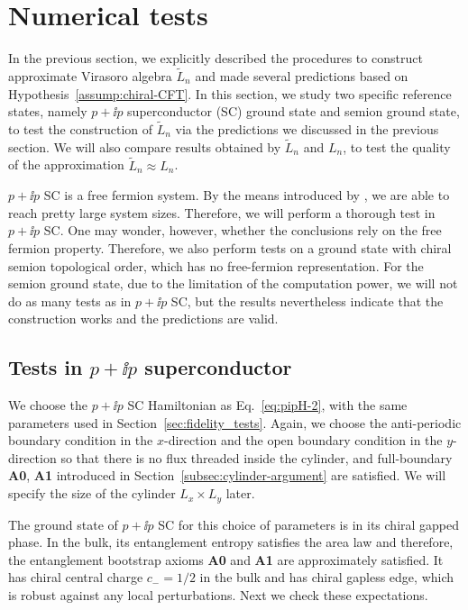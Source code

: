 \documentclass[12pt, nofootinbib]{article}
\theoremstyle{plain}
\theoremstyle{assumption}
\theoremstyle{definition}
\theoremstyle{plain}
\theoremstyle{plain}
\theoremstyle{plain}
\theoremstyle{plain}
\theoremstyle{plain}
\def\Leff{\widetilde{L}}
\begin{document}
\section{Numerical tests}
\label{sec:numerics} 
In the previous section, we explicitly described the procedures to construct approximate Virasoro algebra $\Leff_n$ and made several predictions based on Hypothesis~\ref{assump:chiral-CFT}. In this section, we study two specific reference states, namely $p+\ii p$ superconductor (SC) ground state and semion ground state, to test the construction of $\Leff_n$ via the predictions we discussed in the previous section. We will also compare results obtained by $\Leff_n$ and $L_n$, to test the quality of the approximation $\Leff_n \approx L_n$. 

$p+\ii p$ SC is a free fermion system. By the means introduced by \cite{Eisler2009}, we are able to reach pretty large system sizes. Therefore, we will perform a thorough test in $p+\ii p$ SC.  One may wonder, however, whether the conclusions rely on the free fermion property.   Therefore, we also perform tests on a ground state with chiral semion topological order, which has no free-fermion representation.  For the semion ground state, due to the limitation of the computation power, we will not do as many tests as in $p+\ii p$ SC, but the results nevertheless indicate that the construction works and the predictions are valid. 

\subsection{Tests in $p+\ii p$ superconductor}
We choose the $p+\ii p$ SC Hamiltonian as Eq.~\eqref{eq:pipH-2}, with the same parameters used in Section~\ref{sec:fidelity_tests}. Again, we choose the anti-periodic boundary condition in the $x$-direction and the open boundary condition in the $y$-direction so that there is no flux threaded inside the cylinder, and full-boundary {\bf A0}, {\bf A1} introduced in Section~\ref{subsec:cylinder-argument} are satisfied. We will specify the size of the cylinder $L_x\times L_y$ later. 

The ground state of $p+\ii p$ SC for this choice of parameters is in its chiral gapped phase. In the bulk, its entanglement entropy satisfies the area law and therefore, the entanglement bootstrap axioms {\bf A0} and {\bf A1} are approximately satisfied.
It has chiral central charge $c_{-}=1/2$ in the bulk and has chiral gapless edge, which is robust against any local perturbations. 
Next we check these expectations.
\end{document}
